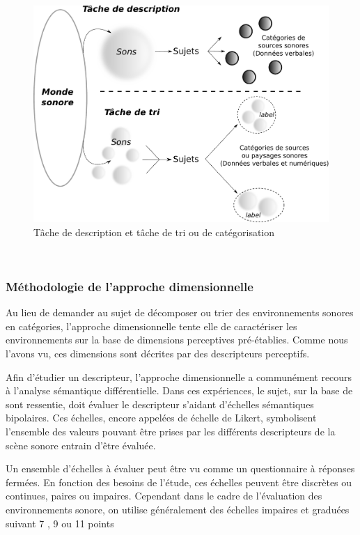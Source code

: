\begin{figure}[bth]
        \myfloatalign
        \includegraphics[width=\linewidth]{gfx/desCat}
        \caption{Tâche de description et tâche de tri ou de catégorisation}\label{fig:descat}
\end{figure}

 \\

\subsubsection{Méthodologie de l'approche dimensionnelle}

Au lieu de demander au sujet de décomposer ou trier des environnements sonores en catégories, l'approche dimensionnelle tente elle de caractériser les environnements sur la base de dimensions perceptives pré-établies. Comme nous l'avons vu, ces dimensions sont décrites par des descripteurs perceptifs.

Afin d'étudier un descripteur, l'approche dimensionnelle a communément recours à l'analyse sémantique différentielle. Dans ces expériences, le sujet, sur la base de sont ressentie, doit évaluer le descripteur s'aidant d'échelles sémantiques bipolaires. Ces échelles, encore appelées de échelle de Likert, symbolisent l'ensemble des valeurs pouvant être prises par les différents descripteurs de la scène sonore entrain d'être évaluée. 

Un ensemble d'échelles à évaluer peut être vu comme un questionnaire à réponses fermées. En fonction des besoins de l'étude, ces échelles peuvent être discrètes ou continues, paires ou impaires. Cependant dans le cadre de l'évaluation des environnements sonore, on utilise généralement des échelles impaires et graduées suivant 7 \citep{raimbault2006qualitative}, 9 \citep{hall2013exploratory} ou 11 points \citep{ricciardi2015sound}

